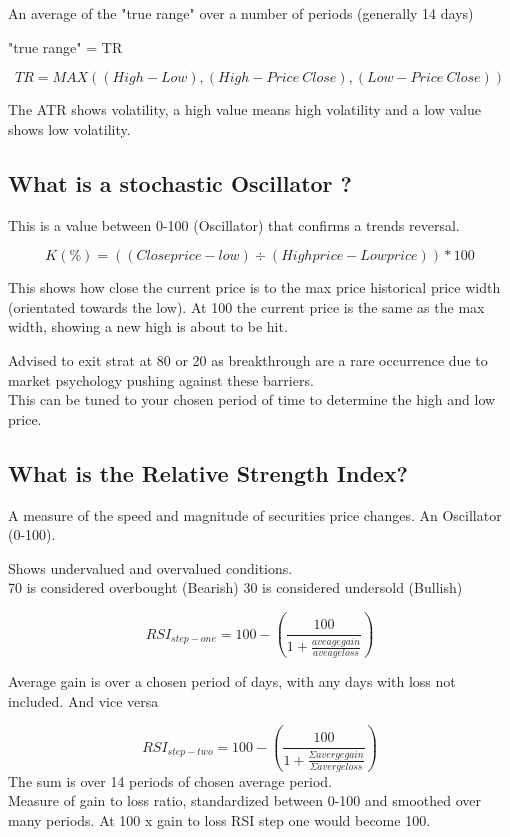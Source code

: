 \documentclass[11pt]{scrartcl} %
\begin{document}
An average of the "true range" over a number of periods (generally 14 days)

"true range" = TR

\[ TR = MAX((High-Low),(High - Price\:Close),(Low-Price\:Close)) \]

The ATR shows volatility, a high value means high volatility and a low value shows low volatility.

\subsection{What is a stochastic Oscillator ?}

This is a value between 0-100 (Oscillator) that confirms a trends reversal.

\[ K(\%) = ((Close price - low) \div (High price - Low price)) * 100\] 

This shows how close the current price is to the max price historical price width (orientated towards the low).
At 100 the current price is the same as the max width, showing a new high is about to be hit.

Advised to exit strat at 80 or 20 as breakthrough are a rare occurrence due to market psychology pushing
against these barriers.\\

This can be tuned to your chosen period of time to determine the high and low price.

\subsection{What is the Relative Strength Index?}

A measure of the speed and magnitude of securities price changes. An Oscillator (0-100).

Shows undervalued and overvalued conditions.\\

70 is considered overbought (Bearish)
30 is considered undersold (Bullish)

\[ RSI_{step-one} = 100 - (\frac{100}{1+\frac{aveage gain}{aveage loss}}) \]

Average gain is over a chosen period of days, with any days with loss not included. And vice versa

\[ RSI_{step-two} = 100 - (\frac{100}{1+ \frac{\Sigma avergegain}{\Sigma averge loss}}) \]
The sum is over 14 periods of chosen average period.\\

Measure of gain to loss ratio, standardized between 0-100 and smoothed over many periods. At 100 x gain to loss RSI step one would become 100.
\end{document}
